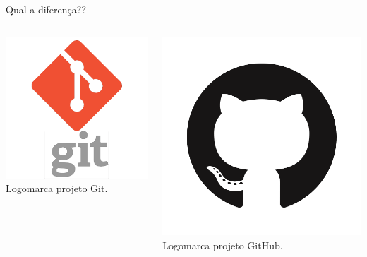 \documentclass{beamer}
\begin{document}
\begin{frame}{Qual a diferença??}
  \begin{columns}
    \begin{column}{0.4\textwidth}
      \begin{center}
       \includegraphics[height=0.4\paperheight]{fig/aula3/git_logo.png} \\
       \tiny{Logomarca projeto Git}.
      \end{center}
    \end{column}
    \begin{column}{0.4\textwidth}
      \begin{center}
      \includegraphics[height=0.4\paperheight]{fig/aula3/github_logo.png} \\
       \tiny{Logomarca projeto GitHub}.
      \end{center}
    \end{column}    
  \end{columns}
\end{frame}
\end{document}
